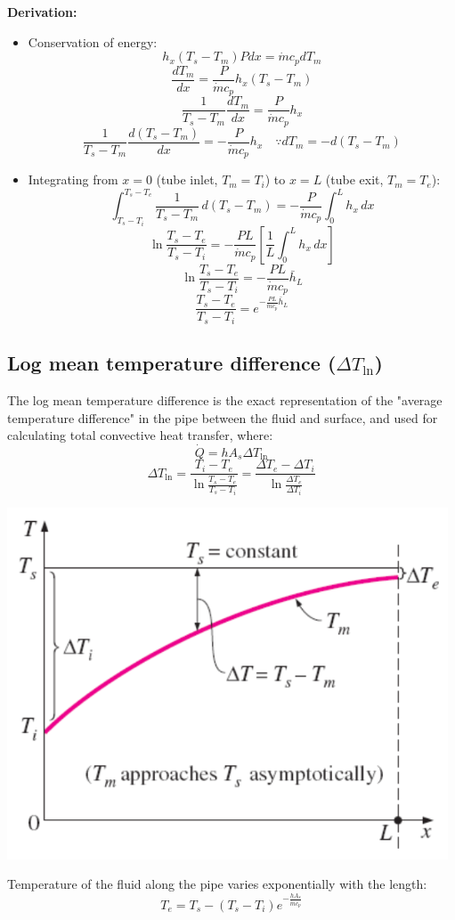 \documentclass[11pt]{article}
\begin{document}
 \newpage

\textbf{Derivation:}
\begin{itemize}
\item Conservation of energy:
\[h_x (T_s - T_m) P dx = \dot{m} c_p dT_m\]
\[\frac{dT_m}{dx} = \frac{P}{\dot{m} c_p} h_x (T_s - T_m)\]
\[\frac{1}{T_s - T_m} \frac{dT_m}{dx} = \frac{P}{\dot{m} c_p} h_x\]
\[\frac{1}{T_s - T_m} \frac{d(T_s - T_m)}{dx} = -\frac{P}{\dot{m} c_p} h_x \quad \because dT_m = -d(T_s - T_m)\]
\item Integrating from \(x = 0\) (tube inlet, \(T_m = T_i\)) to \(x = L\) (tube exit, \(T_m = T_e\)):
\[\int_{T_s - T_i}^{T_s - T_e} \frac{1}{T_s - T_m} \, d(T_s - T_m) = - \frac{P}{\dot{m} c_p} \int_0^L h_x \, dx\]
\[\ln \frac{T_s - T_e}{T_s - T_i} = - \frac{PL}{\dot{m} c_p} \left[\frac{1}{L} \int_0^L h_x \, dx \right]\]
\[\ln \frac{T_s - T_e}{T_s - T_i} = - \frac{PL}{\dot{m} c_p} \bar{h}_L\]
\[\frac{T_s - T_e}{T_s - T_i} = e^{-\frac{PL}{\dot{m} c_p} \bar{h}_L}\]
\end{itemize}

 \newpage
\subsection{Log mean temperature difference (\(\Delta T_{\ln}\))}
\label{sec:org5109637}
The log mean temperature difference is the exact representation of the "average temperature difference" in the pipe between the fluid and surface, and used for calculating total convective heat transfer, where:
\[\dot{Q} = h A_s \Delta T_{\ln}\]
\[\Delta T_{\ln} = \frac{T_i - T_e}{\ln \frac{T_s - T_e}{T_s - T_i}} = \frac{\Delta T_e - \Delta T_i}{\ln \frac{\Delta T_e}{\Delta T_i}}\]
\begin{center}
\includegraphics[width=.9\linewidth]{./images/log-mean-temperature-difference-graph.png}
\end{center}
Temperature of the fluid along the pipe varies exponentially with the length:
\[T_e = T_s - (T_s - T_i) e^{-\frac{h A_s}{\dot{m} c_p}}\]
\end{document}
